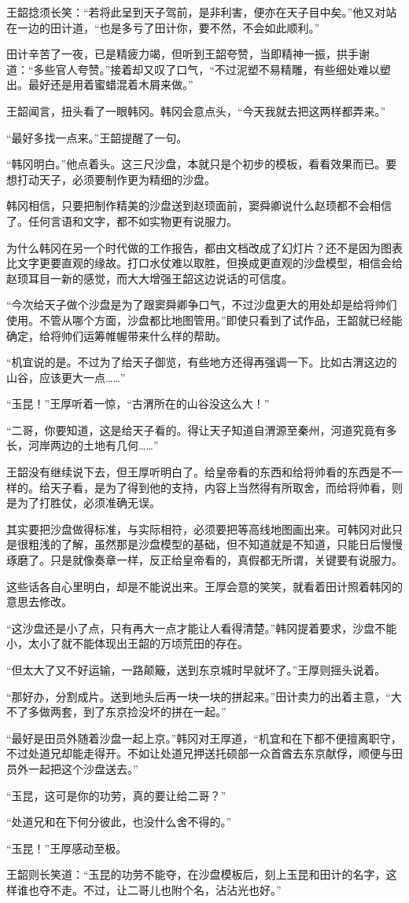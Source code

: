 王韶捻须长笑：“若将此呈到天子驾前，是非利害，便亦在天子目中矣。”他又对站在一边的田计道，“也是多亏了田计你，要不然，不会如此顺利。”

田计辛苦了一夜，已是精疲力竭，但听到王韶夸赞，当即精神一振，拱手谢道：“多些官人夸赞。”接着却又叹了口气，“不过泥塑不易精雕，有些细处难以塑出。最好还是用着蜜蜡混着木屑来做。”

王韶闻言，扭头看了一眼韩冈。韩冈会意点头，“今天我就去把这两样都弄来。”

“最好多找一点来。”王韶提醒了一句。

“韩冈明白。”他点着头。这三尺沙盘，本就只是个初步的模板，看看效果而已。要想打动天子，必须要制作更为精细的沙盘。

韩冈相信，只要把制作精美的沙盘送到赵顼面前，窦舜卿说什么赵顼都不会相信了。任何言语和文字，都不如实物更有说服力。

为什么韩冈在另一个时代做的工作报告，都由文档改成了幻灯片？还不是因为图表比文字更要直观的缘故。打口水仗难以取胜，但换成更直观的沙盘模型，相信会给赵顼耳目一新的感觉，而大大增强王韶这边说话的可信度。

“今次给天子做个沙盘是为了跟窦舜卿争口气，不过沙盘更大的用处却是给将帅们使用。不管从哪个方面，沙盘都比地图管用。”即使只看到了试作品，王韶就已经能确定，给将帅们运筹帷幄带来什么样的帮助。

“机宜说的是。不过为了给天子御览，有些地方还得再强调一下。比如古渭这边的山谷，应该更大一点……”

“玉昆！”王厚听着一惊，“古渭所在的山谷没这么大！”

“二哥，你要知道，这是给天子看的。得让天子知道自渭源至秦州，河道究竟有多长，河岸两边的土地有几何……”

王韶没有继续说下去，但王厚听明白了。给皇帝看的东西和给将帅看的东西是不一样的。给天子看，是为了得到他的支持，内容上当然得有所取舍，而给将帅看，则是为了打胜仗，必须准确无误。

其实要把沙盘做得标准，与实际相符，必须要把等高线地图画出来。可韩冈对此只是很粗浅的了解，虽然那是沙盘模型的基础，但不知道就是不知道，只能日后慢慢琢磨了。只是就像奏章一样，反正给皇帝看的，真假都无所谓，关键要有说服力。

这些话各自心里明白，却是不能说出来。王厚会意的笑笑，就看着田计照着韩冈的意思去修改。

“这沙盘还是小了点，只有再大一点才能让人看得清楚。”韩冈提着要求，沙盘不能小，太小了就不能体现出王韶的万顷荒田的存在。

“但太大了又不好运输，一路颠簸，送到东京城时早就坏了。”王厚则摇头说着。

“那好办，分割成片。送到地头后再一块一块的拼起来。”田计卖力的出着主意，“大不了多做两套，到了东京捡没坏的拼在一起。”

“最好是田员外随着沙盘一起上京。”韩冈对王厚道，“机宜和在下都不便擅离职守，不过处道兄却能走得开。不如让处道兄押送托硕部一众首酋去东京献俘，顺便与田员外一起把这个沙盘送去。”

“玉昆，这可是你的功劳，真的要让给二哥？”

“处道兄和在下何分彼此，也没什么舍不得的。”

“玉昆！”王厚感动至极。

王韶则长笑道：“玉昆的功劳不能夺，在沙盘模板后，刻上玉昆和田计的名字，这样谁也夺不走。不过，让二哥儿也附个名，沾沾光也好。”


